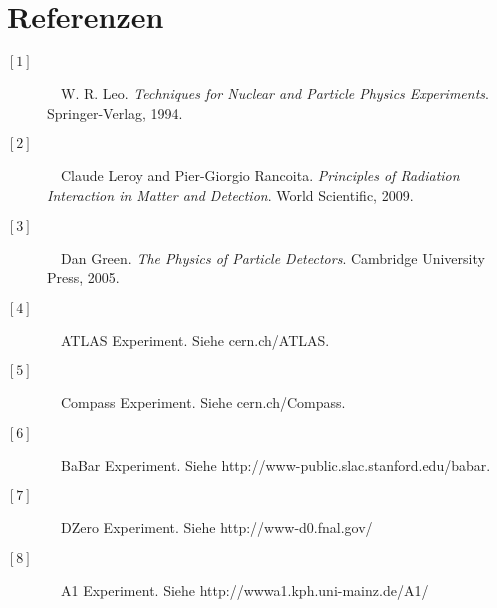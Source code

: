 \documentclass{PoS}
\begin{document}
\section*{Referenzen}
\begin{description}
\item[\ensuremath{[1]}]~~W. R. Leo. \textit{Techniques for Nuclear and Particle Physics
Experiments}. Springer-Verlag, 1994.
\item[\ensuremath{[2]}]~~Claude Leroy and Pier-Giorgio Rancoita. \textit{Principles of Radiation Interaction in Matter
and Detection}. World Scientific, 2009.
\item[\ensuremath{[3]}]~~Dan Green. \textit{The Physics of Particle Detectors}. Cambridge University Press,
2005.
\item[\ensuremath{[4]}]~~ATLAS Experiment. Siehe cern.ch/ATLAS.
\item[\ensuremath{[5]}]~~Compass Experiment. Siehe cern.ch/Compass.
\item[\ensuremath{[6]}]~~BaBar Experiment. Siehe http://www-public.slac.stanford.edu/babar.
\item[\ensuremath{[7]}]~~DZero Experiment. Siehe http://www-d0.fnal.gov/
\item[\ensuremath{[8]}]~~A1 Experiment. Siehe http://wwwa1.kph.uni-mainz.de/A1/
\end{description}
\end{document}
